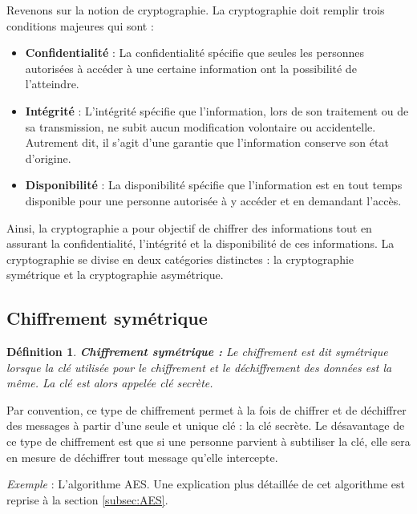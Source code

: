 \documentclass[oneside]{book}
\newtheorem{definition}{Définition}[section]
\begin{document}
\hspace{-0.5cm}Revenons sur la notion de cryptographie. La cryptographie doit remplir trois conditions majeures \cite{intro_crypto} qui sont :
\begin{itemize}
\item \textbf{Confidentialité} : La confidentialité spécifie que seules les personnes autorisées à accéder à une certaine information ont la possibilité de l'atteindre.
\item \textbf{Intégrité} : L'intégrité spécifie que l'information, lors de son traitement ou de sa transmission, ne subit aucun modification volontaire ou accidentelle. Autrement dit, il s'agit d'une garantie que l'information conserve son état d'origine.
\item \textbf{Disponibilité} : La disponibilité spécifie que l'information est en tout temps disponible pour une personne autorisée à y accéder et en demandant l'accès. \\
\end{itemize}

Ainsi, la cryptographie a pour objectif de chiffrer des informations tout en assurant la confidentialité, l'intégrité et la disponibilité de ces informations. La cryptographie se divise en deux catégories distinctes : la cryptographie symétrique et la cryptographie asymétrique. 

\subsection{Chiffrement symétrique}
\label{subsec:Chiffrement_symétrique}

\theoremstyle{definition}
\begin{definition}{\textbf{Chiffrement symétrique :}}
Le chiffrement est dit symétrique \cite{intro_crypto} lorsque la clé utilisée pour le chiffrement et le déchiffrement des données est la même. La clé est alors appelée \textit{clé secrète}. 
\end{definition}

\hspace{-0.5cm}Par convention, ce type de chiffrement permet à la fois de chiffrer et de déchiffrer des messages à partir d'une seule et unique clé : la clé secrète. Le désavantage de ce type de chiffrement est que si une personne parvient à subtiliser la clé, elle sera en mesure de déchiffrer tout message qu'elle intercepte. 

\hspace{-0.5cm}\textit{Exemple} : L'algorithme AES. Une explication plus détaillée de cet algorithme est reprise à la section \ref{subsec:AES}.
\end{document}
